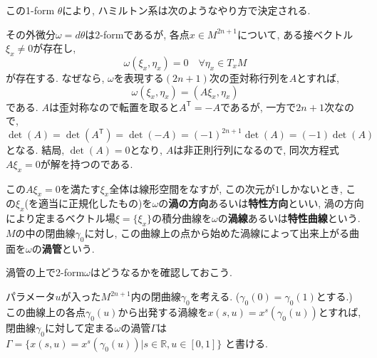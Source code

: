 \documentclass[a4paper]{ujarticle}
\numberwithin{equation}{section}
\theoremstyle{definition}
\begin{document}
    この1-form $\theta$により, ハミルトン系は次のようなやり方で決定される.

    その外微分$\omega = d \theta$は$2$-formであるが, 
    各点$x \in M^{2n + 1}$について, ある接ベクトル$\xi_x \neq 0$が存在し,
    \[
        \omega(\xi_x, \eta_x) = 0 \quad \forall \eta_x \in T_x M
    \]
    が存在する.
    なぜなら, $\omega$を表現する$(2n + 1)$次の歪対称行列を$A$とすれば, 
    \[
        \omega(\xi_x, \eta_x) = (A \xi_x, \eta_x)
    \]
    である. $A$は歪対称なので転置を取ると$A^{\textsf{T}} = -A$であるが,
    一方で$2n + 1$次なので, 
    \[
        \det(A) = \det(A^{\textsf{T}}) = \det(-A) = (-1)^{2n + 1} \det(A) = (-1) \det(A)
    \]
    となる. 結局, $\det(A) = 0$となり, $A$は非正則行列になるので, 
    同次方程式$A \xi_x = 0$が解を持つのである.

    この$A \xi_x = 0$を満たす$\xi_x$全体は線形空間をなすが, この次元が$1$しかないとき, 
    この$\xi_x$(を適当に正規化したもの)を$\omega$の\textbf{渦の方向}あるいは\textbf{特性方向}といい,
    渦の方向により定まるベクトル場$\xi = \{\xi_x\}$の積分曲線を$\omega$の\textbf{渦線}あるいは\textbf{特性曲線}という.
    $M$の中の閉曲線$\gamma_0$に対し, この曲線上の点から始めた渦線によって出来上がる曲面を$\omega$の\textbf{渦管}という.

    渦管の上で2-form$\omega$はどうなるかを確認しておこう.

    パラメータ$u$が入った$M^{2n + 1}$内の閉曲線$\gamma_0$を考える. ($\gamma_0(0) = \gamma_0(1)$とする.)
    この曲線上の各点$\gamma_0(u)$から出発する渦線を$x(s, u) = x^{s}(\gamma_0(u))$とすれば,
    閉曲線$\gamma_0$に対して定まる$\omega$の渦管$\Gamma$は
    $\Gamma = \{x(s, u) = x^{s}(\gamma_0(u))| s \in \mathbb{R}, u \in [0,1]\}$
    と書ける.
\end{document}

